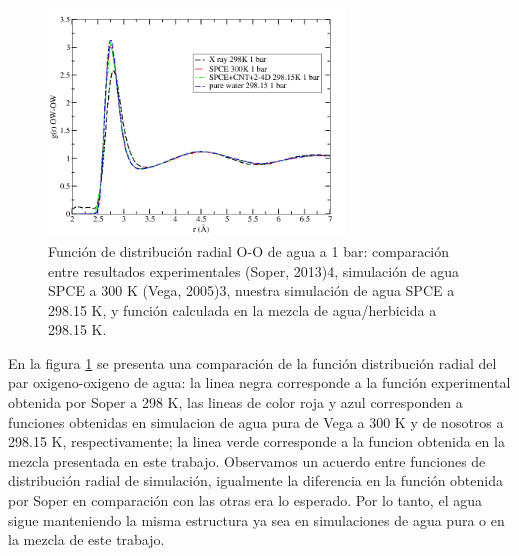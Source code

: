 

\begin{figure}[!hbt]
    \centering
    \includegraphics[width=0.7\textwidth,keepaspectratio=true]{resultados/gOOcartel.png}
    \caption{Función de distribución radial O-O de agua a 1 bar: comparación entre resultados experimentales (Soper, 2013)4, simulación de agua SPCE a 300 K (Vega, 2005)3, nuestra simulación de agua SPCE a 298.15 K, y función calculada en la mezcla de agua/herbicida a 298.15 K.}
    \label{fig:OO}
\end{figure}

En la figura \ref{fig:OO} se presenta una comparación de la función distribución radial del par oxigeno-oxigeno de agua: la linea negra corresponde a la función experimental obtenida por Soper \cite{Soper2013} a 298 K, las lineas de color roja y azul corresponden a funciones obtenidas en simulacion de agua pura de Vega \cite{vega2005} a 300 K y de nosotros a 298.15 K, respectivamente; la linea verde corresponde a la funcion obtenida en la mezcla presentada en este trabajo. Observamos un acuerdo entre funciones de distribución radial de simulación, igualmente la diferencia en la función obtenida por Soper en comparación con las otras era lo esperado. Por lo tanto, el agua sigue manteniendo la misma estructura ya sea en simulaciones de agua pura o en la mezcla de este trabajo.\\

